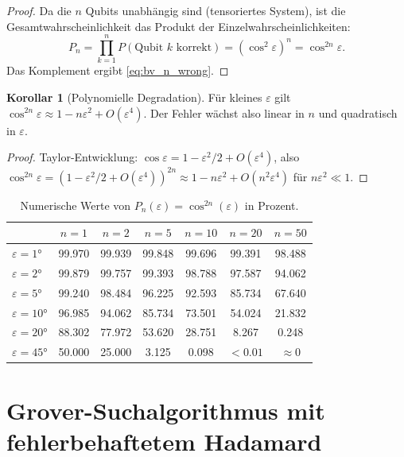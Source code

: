 ﻿\documentclass[11pt,a4paper]{article}
\theoremstyle{definition}
\newtheorem{corollary}[theorem]{Korollar}
\newcommand{\eps}{\varepsilon}
\begin{document}
\begin{proof}
  Da die $n$ Qubits unabhängig sind (tensoriertes System), ist die Gesamtwahrscheinlichkeit
  das Produkt der Einzelwahrscheinlichkeiten:
  \[
    P_n = \prod_{k=1}^{n} P(\text{Qubit } k \text{ korrekt}) = (\cos^2\eps)^n = \cos^{2n}\eps.
  \]
  Das Komplement ergibt \eqref{eq:bv_n_wrong}.
\end{proof}

\begin{corollary}[Polynomielle Degradation]
  Für kleines $\eps$ gilt $\cos^{2n}\eps \approx 1 - n\eps^2 + O(\eps^4)$.
  Der Fehler wächst also linear in $n$ und quadratisch in $\eps$.
\end{corollary}

\begin{proof}
  Taylor-Entwicklung: $\cos\eps = 1 - \eps^2/2 + O(\eps^4)$, also
  $\cos^{2n}\eps = (1-\eps^2/2+O(\eps^4))^{2n} \approx 1 - n\eps^2 + O(n^2\eps^4)$
  für $n\eps^2 \ll 1$.
\end{proof}

\begin{table}[H]
  \centering
  \caption{Numerische Werte von $P_n(\eps) = \cos^{2n}(\eps)$ in Prozent.}
  \label{tab:bv_table}
  \begin{tabular}{lcccccc}
    \toprule
    & $n=1$ & $n=2$ & $n=5$ & $n=10$ & $n=20$ & $n=50$ \\
    \midrule
    $\eps=1 °$  & 99.970 & 99.939 & 99.848 & 99.696 & 99.391 & 98.488 \\
    $\eps=2 °$  & 99.879 & 99.757 & 99.393 & 98.788 & 97.587 & 94.062 \\
    $\eps=5 °$  & 99.240 & 98.484 & 96.225 & 92.593 & 85.734 & 67.640 \\
    $\eps=10 °$ & 96.985 & 94.062 & 85.734 & 73.501 & 54.024 & 21.832 \\
    $\eps=20 °$ & 88.302 & 77.972 & 53.620 & 28.751 &  8.267 &  0.248 \\
    $\eps=45 °$ & 50.000 & 25.000 &  3.125 &  0.098 & $<0.01$ & $\approx 0$ \\
    \bottomrule
  \end{tabular}
\end{table}

\section{Grover-Suchalgorithmus mit fehlerbehaftetem Hadamard}
\label{sec:grover}
\end{document}
